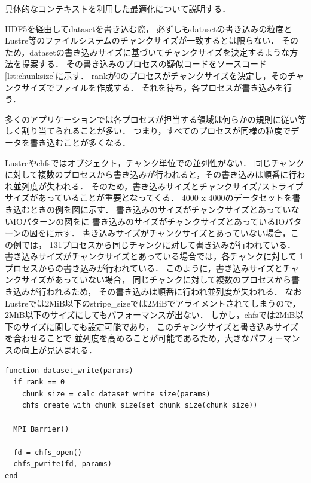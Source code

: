 \documentclass[submit,techrep,noauthor]{ipsj}
\begin{document}
具体的なコンテキストを利用した最適化について説明する．

HDF5を経由してdatasetを書き込む際，
必ずしもdatasetの書き込みの粒度とLustre等のファイルシステムのチャンクサイズが一致するとは限らない．
そのため，datasetの書き込みサイズに基づいてチャンクサイズを決定するような方法を提案する．
その書き込みのプロセスの疑似コードをソースコード\ref{lst:chunksize}に示す．
rankが0のプロセスがチャンクサイズを決定し，そのチャンクサイズでファイルを作成する．
それを待ち，各プロセスが書き込みを行う．

多くのアプリケーションでは各プロセスが担当する領域は何らかの規則に従い等しく割り当てられることが多い．
つまり，すべてのプロセスが同様の粒度でデータを書き込むことが多くなる．

Lustreやchfsではオブジェクト，チャンク単位での並列性がない．
同じチャンクに対して複数のプロセスから書き込みが行われると，その書き込みは順番に行われ並列度が失われる．
そのため，書き込みサイズとチャンクサイズ/ストライプサイズがあっていることが重要となってくる．
4000 x 4000のデータセットを書き込むときの例を図に示す．
書き込みのサイズがチャンクサイズとあっていないIOパターンの図をに
書き込みのサイズがチャンクサイズとあっているIOパターンの図をに示す．
書き込みサイズがチャンクサイズとあっていない場合，この例では，
131プロセスから同じチャンクに対して書き込みが行われている．
書き込みサイズがチャンクサイズとあっている場合では，各チャンクに対して
1プロセスからの書き込みが行われている．
このように，書き込みサイズとチャンクサイズがあっていない場合，
同じチャンクに対して複数のプロセスから書き込みが行われるため，
その書き込みは順番に行われ並列度が失われる．
なおLustreでは2MiB以下のstripe\_sizeでは2MiBでアライメントされてしまうので，
2MiB以下のサイズにしてもパフォーマンスが出ない．
しかし，chfsでは2MiB以下のサイズに関しても設定可能であり，
このチャンクサイズと書き込みサイズを合わせることで
並列度を高めることが可能であるため，大きなパフォーマンスの向上が見込まれる．

\begin{lstlisting}[caption=チャンクサイズの決定,label=lst:chunksize]
function dataset_write(params)
  if rank == 0
    chunk_size = calc_dataset_write_size(params)
    chfs_create_with_chunk_size(set_chunk_size(chunk_size))
  
  MPI_Barrier()

  fd = chfs_open()
  chfs_pwrite(fd, params)
end
\end{lstlisting}
\end{document}
